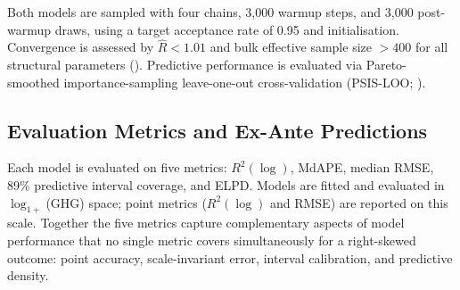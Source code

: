 Both models are sampled with four chains, 3,000 warmup steps, and 3,000 post-warmup draws, using a target acceptance rate of 0.95 and  initialisation. Convergence is assessed by $\hat{R} < 1.01$ and bulk effective sample size $> 400$ for all structural parameters (). Predictive performance is evaluated via Pareto-smoothed importance-sampling leave-one-out cross-validation (PSIS-LOO; ).

\subsection{Evaluation Metrics and Ex-Ante Predictions}

Each model is evaluated on five metrics: $R^2(\log)$, MdAPE, median RMSE, 89\% predictive interval coverage, and ELPD. Models are fitted and evaluated in $\log_{1+}$(GHG) space; point metrics ($R^2(\log)$ and RMSE) are reported on this scale. Together the five metrics capture complementary aspects of model performance that no single metric covers simultaneously for a right-skewed outcome: point accuracy, scale-invariant error, interval calibration, and predictive density.

